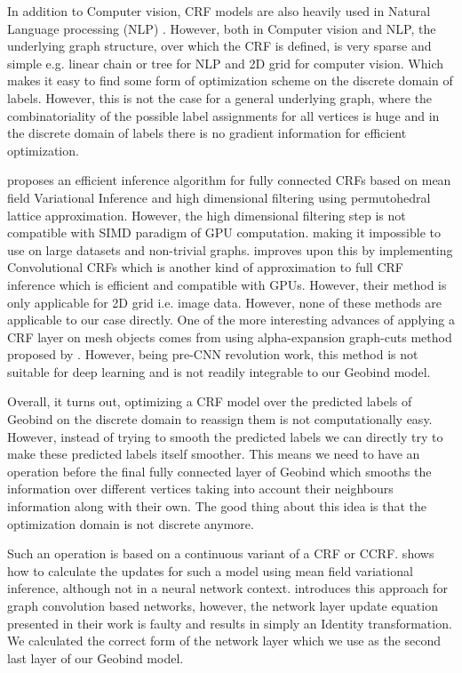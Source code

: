 In addition to Computer vision, CRF models are also heavily used in Natural Language processing (NLP)
\citep{roark2004discriminative,mccallum2003early,liu2017identification}. However, both in Computer
vision and NLP, the underlying graph structure, over which the CRF is defined, is very sparse and
simple e.g. linear chain or tree for NLP and 2D grid for computer vision. Which makes it easy to
find some form of optimization scheme on the discrete domain of labels. However, this is not the
case for a general underlying graph, where the combinatoriality of the possible label assignments
for all vertices is huge and in the discrete domain of labels there is no gradient information for
efficient optimization.

\citet{krahenbuhl2012efficient} proposes an efficient inference algorithm for fully connected CRFs
based on mean field Variational Inference and high dimensional filtering using permutohedral lattice
approximation. However, the high dimensional filtering step is not compatible with
SIMD\citep{nickolls2008scalable} paradigm of GPU computation. \citep{teichmann2018convolutional}
making it impossible to use on large datasets and non-trivial graphs.
\citet{teichmann2018convolutional} improves upon this by implementing Convolutional CRFs which is
another kind of approximation to full CRF inference which is efficient and compatible with GPUs.
However, their method is only applicable for 2D grid i.e. image data.  However, none of these methods
are applicable to our case directly. One of the more interesting advances of applying a CRF layer on
mesh objects comes from \citet{kalogerakis2010learning} using alpha-expansion graph-cuts method proposed by
\citet{boykov2001fast}. However, being pre-CNN revolution work, this method is not suitable for deep
learning and is not readily integrable to our Geobind model. 
\par
Overall, it turns out, optimizing a CRF model over the predicted labels of Geobind on the discrete
domain to reassign them is not computationally easy. However, instead of trying to smooth the
predicted labels we can directly try to make these predicted labels itself smoother. This means we
need to have an operation before the final fully connected layer of Geobind which smooths the
information over different vertices taking into account their neighbours information along with
their own. The good thing about this idea is that the optimization domain is not discrete anymore.

Such an operation is based on a continuous variant of a CRF or CCRF. \citet{ristovski2013continuous}
shows how to calculate the updates for such a model using mean field variational inference, although
not in a neural network context. \citet{gao2019conditional} introduces this approach for graph
convolution based networks, however, the network layer update equation presented in their work is
faulty and results in simply an Identity transformation. We calculated the correct
form of the network layer which we use as the second last layer of our Geobind model.

